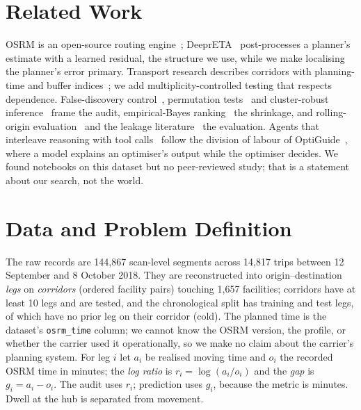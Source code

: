 \documentclass[pdflatex,sn-basic]{sn-jnl}
\begin{document}
\section{Related Work}\label{sec:related}
OSRM is an open-source routing engine~\cite{luxen2011real}; DeeprETA~\cite{hu2022deepreta} post-processes a planner's estimate with a learned residual, the structure we use, while we make localising the planner's error primary. Transport research describes corridors with planning-time and buffer indices~\cite{fhwa2005reliability,jones2005measuring}; we add multiplicity-controlled testing that respects dependence. False-discovery control~\cite{benjamini1995controlling,benjamini2001control}, permutation tests~\cite{phipson2010permutation} and cluster-robust inference~\cite{cameron2015practitioner} frame the audit, empirical-Bayes ranking~\cite{efron1975data,morris1983parametric} the shrinkage, and rolling-origin evaluation~\cite{tashman2000out} and the leakage literature~\cite{kaufman2012leakage,kapoor2023leakage} the evaluation. Agents that interleave reasoning with tool calls~\cite{yao2023react} follow the division of labour of OptiGuide~\cite{li2023optiguide}, where a model explains an optimiser's output while the optimiser decides. We found notebooks on this dataset but no peer-reviewed study; that is a statement about our search, not the world.

\section{Data and Problem Definition}\label{sec:data}
The raw records are 144,867 scan-level segments across 14,817 trips between 12 September and 8 October 2018. They are reconstructed into \fzLegsTotal{} origin--destination \emph{legs} on \fzCorridorsTotal{} \emph{corridors} (ordered facility pairs) touching 1,657 facilities; \fzCorridorsTested{} corridors have at least 10 legs and are tested, and the chronological split has \fzSplitTrain{} training and \fzSplitTest{} test legs, of which \fzColdLegsTest{} have no prior leg on their corridor (cold). The planned time is the dataset's \texttt{osrm\_time} column; we cannot know the OSRM version, the profile, or whether the carrier used it operationally, so we make no claim about the carrier's planning system. For leg $i$ let $a_i$ be realised moving time and $o_i$ the recorded OSRM time in minutes; the \emph{log ratio} is $r_i=\log(a_i/o_i)$ and the \emph{gap} is $g_i=a_i-o_i$. The audit uses $r_i$; prediction uses $g_i$, because the metric is minutes. Dwell at the hub is separated from movement.
\end{document}
